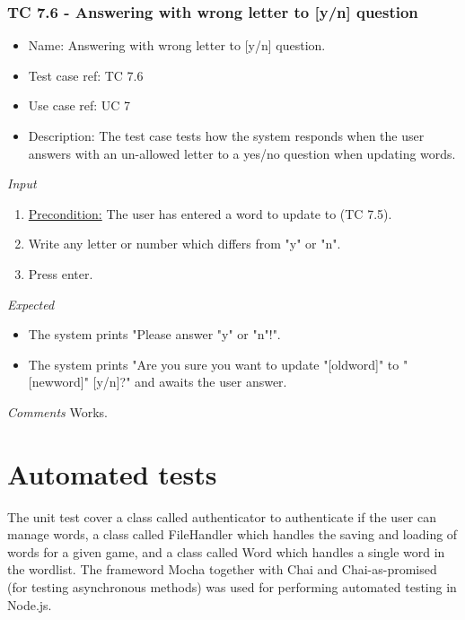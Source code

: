 \documentclass[12pt, letterpaper]{article}
\begin{document}
\subsubsection{TC 7.6 - Answering with wrong letter to [y/n] question}
\begin{itemize}
	\item Name: Answering with wrong letter to [y/n] question.
	\item Test case ref: TC 7.6
	\item Use case ref: UC 7
	\item Description: The test case tests how the system responds when the user answers with an un-allowed letter to a yes/no question when updating words.
\end{itemize}
\emph{Input}
\begin{enumerate}
	\item \underline{Precondition:} The user has entered a word to update to (TC 7.5).
	\item Write any letter or number which differs from "y" or "n".
	\item Press enter.
\end{enumerate}
\emph{Expected}
\begin{itemize}
	\item The system prints "Please answer "y" or "n"!".
	\item The system prints "Are you sure you want to update "[oldword]" to "[newword]" [y/n]?" and awaits the user answer.
\end{itemize}
\begin{Form}
	\newline
	\newline
\end{Form}
\newline
\emph{Comments}
Works.
\section{Automated tests}
The unit test cover a class called authenticator to authenticate if the user can manage words, a class called FileHandler which handles the saving and loading of words for a given game, and a class called Word which handles a single word in the wordlist. The frameword Mocha together with Chai and Chai-as-promised (for testing asynchronous methods) was used for performing automated testing in Node.js.
\end{document}
